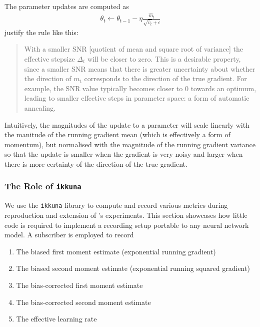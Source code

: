 The parameter updates are computed as
\begin{align}
    \theta_t \leftarrow \theta_{t-1}  - \eta \frac{\widehat{m}_t}{\sqrt{\widehat{v}_t} +
    \epsilon}
    \label{eq:adam}
\end{align}
\citeauthor{kingma2014adam} justify the rule like this:
\begin{quote}
    With a smaller SNR [quotient of mean and square root of variance] the
    effective stepsize $\Delta_t$ will be closer to zero. This is a desirable
    property, since a smaller SNR means that there is greater uncertainty about
    whether the direction of $m_t$ corresponds to the direction of the true
    gradient. For example, the SNR value typically becomes closer to $0$ towards
    an optimum, leading to smaller effective steps in parameter space: a form of
    automatic annealing.
\end{quote}

Intuitively, the magnitudes of the update to a parameter will scale linearly
with the manitude of the running gradient mean (which is effectively a form of
momentum), but normalised with the magnitude of the running gradient variance so
that the update is smaller when the gradient is very noisy and larger when there
is more certainty of the direction of the true gradient.

\subsubsection{The Role of \texttt{ikkuna}}%
\label{sub:use_of_ikkuna_for_optimiser_research}

We use the \texttt{ikkuna} library to compute and record various metrics during
reproduction and extension of \citeauthor{kingma2014adam}'s experiments. This
section showcases how little code is required to implement a recording setup
portable to any neural network model. A subscriber is employed to record
\begin{enumerate}
    \item The biased first moment estimate (exponential running gradient)
    \item The biased second moment estimate (exponential running squared
        gradient)
    \item The bias-corrected first moment estimate
    \item The bias-corrected second moment estimate
    \item The effective learning rate
\end{enumerate}

